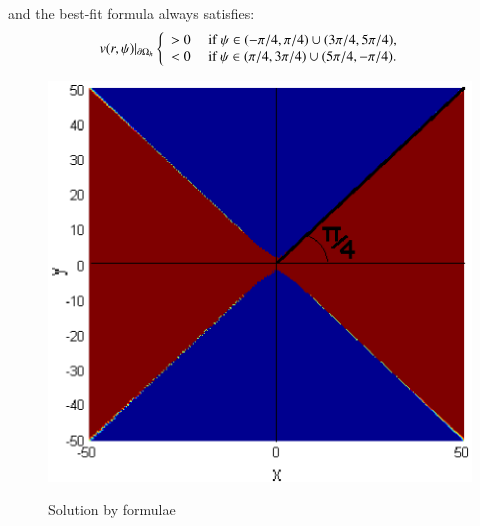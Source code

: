 \documentclass[preprint]{elsarticle}
\newcommand{\dO}{\partial\Omega_{h}}
\begin{document}
and the   best-fit formula \cite{Ch2011} 
always satisfies:
\begin{equation*}
\begin{split}
   & v(r,\psi)|_{\dO}
	 \left\{
	  \begin{array}{l l}
	    > 0 &  \; {\text{if}}\; \psi \in (-\pi/4 , \pi/4  ) \cup (3\pi/4 ,5\pi/4   ), \\ 
	    < 0 &   \; \text{if $\psi \in (\pi/4, 3\pi/4) \cup (5\pi/4 , -\pi/4 ) $}.  
	  \end{array} \right.
\end{split}
\end{equation*}

\begin{figure}[htbp]
	\begin{minipage}[b]{0.45\linewidth}
		\raggedleft
		\includegraphics[width=\linewidth]{positiveNegativeDomains/IC_bnd50_c090_bt1.eps}
		\centerline{Solution  by formulae \cite{Ch2011}}
	\end{minipage}
	\begin{minipage}[b]{0.45\linewidth}
		 \raggedright

\end{minipage}
\end{figure}
\end{document}
